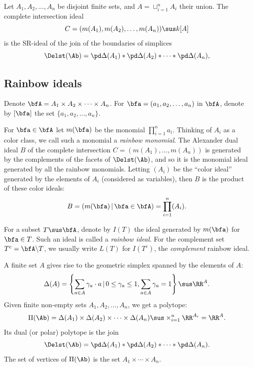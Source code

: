 \setcounter{section}{3}\setcounter{equation}{3}
Let  $A_1, A_2, \ldots, A_n$ be disjoint finite sets, and $A = \sqcup_{i=1}^n A_i$
their union. The complete intersection ideal
\begin{equation*}
  C = (m(A_1), m(A_2), \ldots, m(A_n))  \sus k[A]
\end{equation*}
is the SR-ideal of the join
of the boundaries of simplices
\begin{equation} \label{eq:liaison-join}
  \Delst(\Ab) = \pd \Delta(A_1) * \pd \Delta(A_2) * \cdots * \pd \Delta(A_n),
 \end{equation}

\setcounter{subsection}{1}
\subsection{Rainbow ideals}
Denote $\bfA = A_1 \times A_2 \times \cdots \times A_n$.
For $\bfa = (a_1, a_2, \ldots, a_n)$ in $\bfA$, denote
by $[\bfa ]$ the set $\{a_1, a_2, \ldots, a_n \}$. 

\setcounter{cdrthm}{1}
For $\bfa \in \bfA$ let $m(\bfa)$ be the monomial 
$\prod_{i = 1}^n a_i$. Thinking
of $A_i$ as a color class, we call such a monomial a {\it rainbow
monomial}.  The Alexander dual ideal $B$ of the complete intersection
$C = (m(A_1), \ldots, m(A_n))$ is generated by the complements
of the facets of $\Delst(\Ab)$, and so it is the monomial
ideal generated by all the  rainbow monomials. Letting
$(A_i)$ be the ``color ideal'' generated by the elements of $A_i$ (considered
as variables), then $B$ is the product of these color ideals:
\[ B  = (m(\bfa) \, | \, \bfa \in \bfA) = \prod_{i = 1}^n(A_i). \]

\begin{defi}
For a subset $T \sus \bfA$, denote by $I(T)$ the ideal generated
by $m(\bfa)$ for $\bfa \in T$. Such an ideal is called a {\it rainbow ideal}.
For the complement set $T^c = \bfA \backslash T$, we
usually write $L(T)$ for $I(T^c)$, the {\it complement} rainbow ideal.
\end{defi}

\setcounter{section}{5}\setcounter{subsection}{1}\setcounter{cdrthm}{0}\setcounter{equation}{6}\setcounter{figure}{5}
A finite set $A$ gives rise to the geometric
simplex spanned by the elements of $A$:
\[ \Delta(A) = \left\{\sum_{a \in A} \gamma_a \cdot a \, | \, 0 \leq \gamma_a \leq 1,  \sum_{a \in A} \gamma_a = 1 \right\} \sus \RR^A. \]
Given finite non-empty sets $ A_1, A_2, \ldots, A_n$, 
we get a polytope: 
\[ \Pi(\Ab) = \Delta(A_1) \times \Delta(A_2) \times \cdots
\times \Delta(A_n) \sus \times_{i = 1}^n \RR^{A_i} = \RR^A. \]
Its dual (or polar) polytope
is the join
\[ \Delst(\Ab) =  \pd \Delta(A_1) * \pd \Delta(A_2) * \cdots * \pd \Delta(A_n).
\]
The set of vertices of $\Pi(\Ab)$ is the set $A_1 \times \cdots \times
A_n$.

